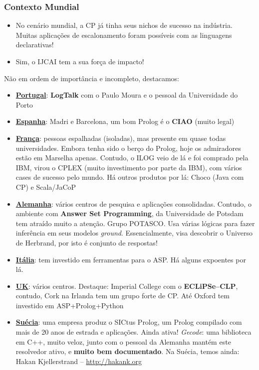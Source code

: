 \documentclass{beamer}
\begin{document}
\begin{frame}[fragile, allowframebreaks=0.85]
\frametitle{Contexto Mundial}

\begin{itemize}
    \item No cenário mundial, a CP  já tinha seus nichos de sucesso na indústria. Muitas aplicações de escalonamento foram possíveis com as linguagens declarativas!
    \item Sim, o IJCAI tem a sua força de impacto!
\end{itemize}

\pause

Não em ordem de importância  e  incompleto, destacamos:
\begin{itemize}
    \item {\underline{\bf Portugal}}: {\bf LogTalk} com o Paulo Moura e o pessoal da Universidade do Porto 
    
    \item {\underline{\bf Espanha}}: Madri e Barcelona, um bom Prolog é o {\bf CIAO} (muito legal)
    
    \item {\underline{\bf França}}: pessoas espalhadas (isoladas), mas presente em quase todas universidades. Embora tenha sido o berço do Prolog, hoje os admiradores estão em Marselha apenas. Contudo, o ILOG veio de lá e foi comprado pela IBM, virou o CPLEX (muito investimento por parte da IBM), com vários cases de sucesso pelo mundo. Há outros produtos por lá: Choco (Java com CP) e Scala/JaCoP
    
    \item {\underline{\bf Alemanha}}: vários centros de pesquisa e aplicações consolidadas. Contudo, o ambiente com  {\bf Answer Set Programming}, da Universidade de Potsdam tem atraído muito a atenção. Grupo POTASCO. Usa várias lógicas para fazer inferência em seus modelos {\em ground}. Essencialmente, visa descobrir o Universo de Herbrand, por isto é conjunto de respostas!
    
    \item {\underline{\bf Itália}}: tem investido em ferramentas para o ASP. Há alguns expoentes por lá. 
    
    \item {\underline{\bf UK}}: vários centros. Destaque: Imperial College com o {\bf ECLiPSe--CLP}, contudo, Cork na Irlanda tem um grupo forte de CP. Até Oxford tem investido em ASP+Prolog+Python

    
    \item {\underline{\bf Suécia}}: uma empresa produz o SICtus Prolog, um Prolog compilado com mais de 20 anos de estrada e aplicações. Ainda ativa! {\em Gecode}: uma biblioteca em C++, muito veloz, junto com o pessoal da Alemanha mantém este resolvedor ativo, e {\bf muito bem documentado}. Na Suécia, temos ainda: Hakan Kjellerstrand -- \url{http://hakank.org}
   

\end{itemize}
\end{frame}
\end{document}
